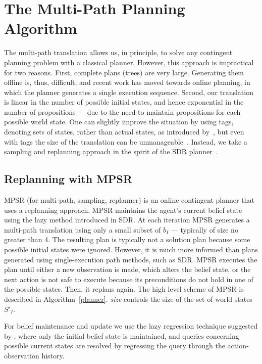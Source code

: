 \documentclass[letterpaper]{article}
\numberwithin{equation}{section}	%
\begin{document}
\section{The Multi-Path Planning Algorithm}

The multi-path translation allows us, in principle, to solve any contingent planning problem with a classical planner.
However, this approach is impractical for two reasons. First, complete plans (trees) are very large. Generating
them offline is, thus, difficult, and recent work has moved towards online planning, in which the planner generates
a single execution sequence. Second, our translation is linear in the number of possible initial states, and hence exponential in the number of propositions --- due to the
need to maintain propositions for each possible world state.
One can slightly improve the situation by using tags, denoting sets of states, rather than actual states, as
introduced by~\citet{PalaciosG09}, but even with tags the size of the translation can be unmanageable~\citep{SDR}. Instead, we take a sampling and replanning approach in the spirit of the SDR planner~\citep{SDR}.

\subsection{Replanning with MPSR}

MPSR (for multi-path, sampling, replanner)
is an online contingent planner that uses a replanning approach.
MPSR maintains the agent's current belief state using the lazy method introduced in SDR. At each
iteration MPSR generates a multi-path translation using only a small subset of $b_I$ --- typically of size no greater than 4.
The resulting plan is typically not a solution plan because some possible initial states were ignored.
However, it is much more informed than plans generated using single-execution path methods, such as SDR.
MPSR executes the plan until either a new observation is made, which alters the belief state, or the next
action is not safe to execute because its preconditions do not hold in one of the possible states. Then, it replans again.
The high level scheme of MPSR  is described in Algorithm~\ref{planner}.
\emph{size} controls the size of the set of world states $S'_I$.


For belief maintenance and update we use the lazy regression technique suggested by \citet{SDR}, where only the initial belief state is maintained, and queries concerning possible current states are resolved by regressing the query through the action-observation history.
\end{document}

